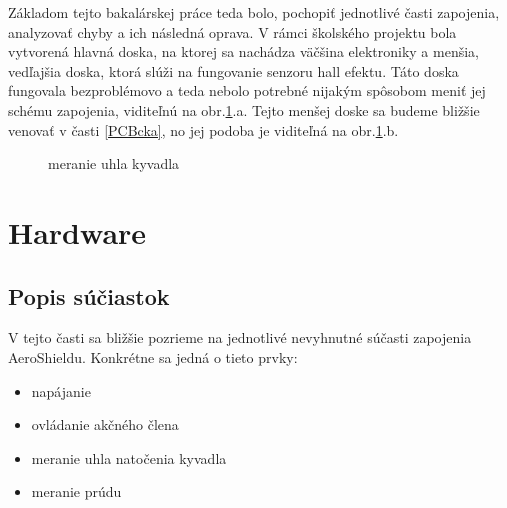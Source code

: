Základom tejto bakalárskej práce teda bolo, pochopiť jednotlivé časti zapojenia, analyzovať chyby a ich následná oprava. V rámci školského projektu bola vytvorená hlavná doska, na ktorej sa nachádza väčšina elektroniky a menšia, vedľajšia doska, ktorá slúži na fungovanie senzoru hall efektu. Táto doska fungovala bezproblémovo a teda nebolo potrebné nijakým spôsobom meniť jej schému zapojenia, viditeľnú na obr.\ref{OBRAZOK 2.1.2}.a. Tejto menšej doske sa budeme bližšie venovať v časti \ref{PCBcka}, no jej podoba je viditeľná na obr.\ref{OBRAZOK 2.1.2}.b.

\begin{figure}[!tbh]
	\hfill
	\hfill
	\hfill
	\caption{meranie uhla kyvadla}\label{OBRAZOK 2.1.2}
\end{figure}



\newpage
\section{Hardware}
\subsection{Popis súčiastok}

V tejto časti sa bližšie pozrieme na jednotlivé nevyhnutné súčasti zapojenia AeroShieldu. Konkrétne sa jedná o tieto prvky:
\begin{multicols}{2}
	\begin{itemize}
		\item napájanie
		\item ovládanie akčného člena
		\item meranie uhla natočenia kyvadla
		\item meranie prúdu
	\end{itemize}
\end{multicols}


